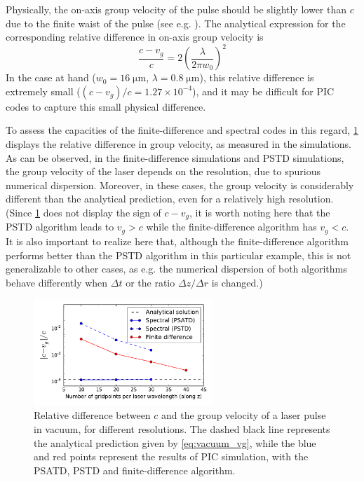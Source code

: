 \documentclass[1p,times]{elsarticle}
\begin{document}
Physically, the on-axis group velocity of the pulse should be slightly lower than $c$ due
to the finite waist of the pulse (see e.g. \cite{Esarey1999}). The
analytical expression for the corresponding relative
difference in on-axis group velocity is
\begin{equation} 
\label{eq:vacuum_vg}
\frac{c-v_g}{c} = 2\left( \frac{\lambda}{2\pi w_0} \right)^2
\end{equation}
\noindent In the case at hand ($w_0=16\;\mathrm{\mu m}$,
$\lambda=0.8\;\mathrm{\mu m}$), this relative difference is extremely
small ($(c-v_g)/c = 1.27 \times 10^{-4}$), and it may be difficult for
PIC codes to capture this small physical difference. 

To assess the capacities of the finite-difference and
spectral codes in this regard, \cref{fig:Vacuum_vg} displays the relative
difference in group velocity, as measured in the
simulations. As can be observed, in the
finite-difference simulations and PSTD simulations, the
group velocity of the laser depends on the resolution, due to spurious
numerical dispersion. Moreover, in these cases, the group velocity is
considerably different than the analytical prediction, even for a
relatively high resolution. (Since \cref{fig:Vacuum_vg} does not display the sign
of $c-v_g$, it is worth noting here that the PSTD algorithm leads to
$v_g > c$ while the finite-difference algorithm has $v_g < c$. It is
also important to realize here that, although the finite-difference
algorithm performs better than the PSTD algorithm in this particular
example, this is not generalizable to other cases, as e.g. the numerical
dispersion of both algorithms behave differently when $\Delta t$ or the ratio $\Delta
z/\Delta r$ is changed.)


\begin{figure}[!h]
\centering
\includegraphics[width=0.6\textwidth]{Vacuum_vg.pdf}
\caption{\label{fig:Vacuum_vg}Relative difference between $c$ and the
group velocity of a laser pulse in vacuum, for different
resolutions. The dashed black line represents
the analytical prediction given by \cref{eq:vacuum_vg}, while the
blue and red points represent the results of PIC simulation, with the
PSATD, PSTD and finite-difference algorithm.}
\end{figure}
\end{document}
